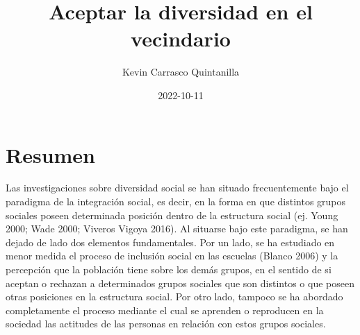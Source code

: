 \documentclass[12pt,twoside]{templates/facsothesis}
\title{Aceptar la diversidad en el vecindario}
\author{Kevin Carrasco Quintanilla}
\date{2022-10-11}
\begin{document}

  \maketitle

\frontmatter %
\pagestyle{empty} %



  \setcounter{tocdepth}{1}
  \setlength{\parskip}{0pt}
  \tableofcontents

\setlength\parskip{1em plus 0.1em minus 0.2em}

  \listoftables

  \listoffigures



\mainmatter %
\pagestyle{fancyplain} %

\hypertarget{resumen}{%
\chapter{Resumen}\label{resumen}}

Las investigaciones sobre diversidad social se han situado frecuentemente bajo el paradigma de la integración social, es decir, en la forma en que distintos grupos sociales poseen determinada posición dentro de la estructura social (ej. Young 2000; Wade 2000; Viveros Vigoya 2016). Al situarse bajo este paradigma, se han dejado de lado dos elementos fundamentales. Por un lado, se ha estudiado en menor medida el proceso de inclusión social en las escuelas (Blanco 2006) y la percepción que la población tiene sobre los demás grupos, en el sentido de si aceptan o rechazan a determinados grupos sociales que son distintos o que poseen otras posiciones en la estructura social. Por otro lado, tampoco se ha abordado completamente el proceso mediante el cual se aprenden o reproducen en la sociedad las actitudes de las personas en relación con estos grupos sociales.
\end{document}
